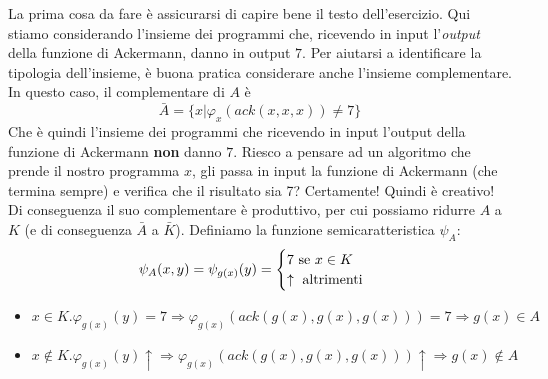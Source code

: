 \documentclass[a4paper,oneside]{scrbook}
\begin{document}
La prima cosa da fare è assicurarsi di capire bene il testo dell'esercizio.
Qui stiamo considerando l'insieme dei programmi che, ricevendo in input l'\textit{output} della funzione di Ackermann, danno in output $7$.
Per aiutarsi a identificare la tipologia dell'insieme, è buona pratica considerare anche l'insieme complementare. In questo caso, il complementare di $A$ è
$$\bar{A}=\{x|\varphi_x(ack(x,x,x))\ne 7\}$$
Che è quindi l'insieme dei programmi che ricevendo in input l'output della funzione di Ackermann \textbf{non} danno $7$.
Riesco a pensare ad un algoritmo che prende il nostro programma $x$, gli passa in input la funzione di Ackermann (che termina sempre) e verifica che il risultato sia 7?
Certamente! Quindi è creativo! Di conseguenza il suo complementare è produttivo, per cui possiamo ridurre $A$ a $K$ (e di conseguenza $\bar{A}$ a $\bar{K}$).
Definiamo la funzione semicaratteristica $\psi_A$:
\begin{equation*}
	\psi_A(x,y)=
	\psi_{g(x)}(y)=
	\begin{cases}
		7 \text{ se } x \in K\\
		\uparrow \text{ altrimenti}
	\end{cases}\\
\end{equation*}
\begin{itemize}
	\item $x\in K.\varphi_{g(x)}(y)=7 \Rightarrow \varphi_{g(x)}(ack(g(x),g(x),g(x)))=7 \Rightarrow g(x) \in A$
	\item $x\notin K.\varphi_{g(x)}(y)\uparrow \Rightarrow \varphi_{g(x)}(ack(g(x),g(x),g(x)))\uparrow \Rightarrow g(x) \notin A$ 
\end{itemize}
\end{document}
